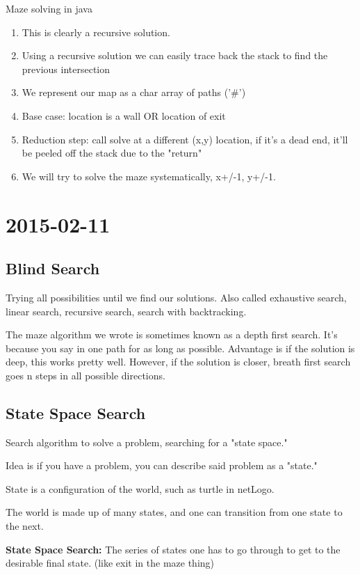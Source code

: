 \documentclass [12 pt, twoside] {article}
\begin{document}
Maze solving in java
\begin{enumerate}
	\item This is clearly a recursive solution.
	\item Using a recursive solution we can easily trace back the stack to find the previous intersection
	\item We represent our map as a char array of paths ('\#')
	\item Base case: location is a wall OR location of exit
	\item Reduction step: call solve at a different (x,y) location, if it's a dead end, it'll be peeled off the stack due to the "return"
	\item We will try to solve the maze systematically, x+/-1, y+/-1.
\end{enumerate}

\section{2015-02-11}
\subsection{Blind Search}

Trying all possibilities until we find our solutions. Also called exhaustive search, linear search,
recursive search, search with backtracking.


The maze algorithm we wrote is sometimes known as a depth first search. It's because
you say in one path for as long as possible. Advantage is if the solution is deep, this works
pretty well. However, if the solution is closer, breath first search goes n steps in all
possible directions.

\subsection{State Space Search}

Search algorithm to solve a problem, searching for a "state space."

Idea is if you have a problem, you can describe said problem as a "state."

State is a configuration of the world, such as turtle in netLogo.

The world is made up of many states, and one can transition from one state to the next.

\textbf{State Space Search:} The series of states one has to go through to get to the desirable final state. (like exit in the maze thing)
\end{document}
